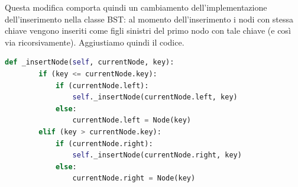 \documentclass{article}
\begin{document}
Questa modifica comporta quindi un cambiamento dell'implementazione dell'inserimento nella classe BST: al momento dell'inserimento i nodi con stessa chiave vengono inseriti come figli sinistri del primo nodo con tale chiave (e così via ricorsivamente). Aggiustiamo quindi il codice.

\begin{lstlisting}[language=Python, caption={Funzione ausiliaria di inserimento aggiornata}]
    def _insertNode(self, currentNode, key):
        if (key <= currentNode.key):
            if (currentNode.left):
                self._insertNode(currentNode.left, key)
            else:
                currentNode.left = Node(key)
        elif (key > currentNode.key):
            if (currentNode.right):
                self._insertNode(currentNode.right, key)
            else:
                currentNode.right = Node(key)
\end{lstlisting}
\end{document}
